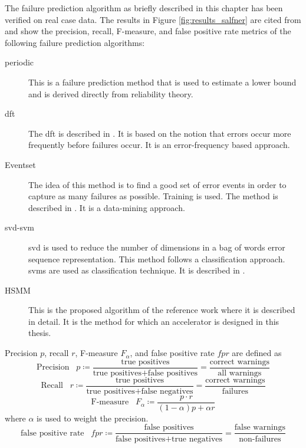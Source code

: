 \documentclass[mscthesis]{usiinfthesis}
\begin{document}
The failure prediction algorithm as briefly described in this chapter has been
verified on real case data. The results in Figure \ref{fig:results_salfner} are
cited from \cite{salfner08} and show the precision, recall, F-measure, and false
positive rate metrics of the following failure prediction algorithms:
\begin{description}
    \item[periodic] This is a failure prediction method that is used to estimate
        a lower bound and is derived directly from reliability theory.
    \item[\acrshort{dft}] The \acrfull{dft} is described in \cite{lin88}. It is
        based on the notion that errors occur more frequently before failures
        occur. It is an error-frequency based approach.
    \item[Eventset] The idea of this method is to find a good set of error
        events in order to capture as many failures as possible. Training is
        used. The method is described in \cite{ICDM02_Vilalta}. It is
        a data-mining approach.
    \item[\acrshort{svd}-\acrshort{svm}] \acrfull{svd} is used to reduce the
        number of dimensions in a bag of words error sequence representation.
        This method follows a classification approach. \glspl{svm} are used
        as classification technique. It is described in \cite{domeniconi02}.
    \item[HSMM] This is the proposed algorithm of the reference work
        \cite{salfner08} where it is described in detail. It is the method for
        which an accelerator is designed in this thesis.
\end{description}
Precision $p$, recall $r$, F-measure $F_\alpha$, and false positive rate $fpr$
are defined as
\begin{equation}
    \text{Precision} \;\;\; p
        \coloneqq \frac{\text{true positives}}{\text{true positives}
        +\text{false positives}}
        = \frac{\text{correct warnings}}{\text{all warnings}}
\end{equation}
\begin{equation}
    \text{Recall} \;\;\; r 
        \coloneqq \frac{\text{true positives}}{\text{true positives}
        +\text{false negatives}}
        = \frac{\text{correct warnings}}{\text{failures}}
\end{equation}
\begin{equation}
    \text{F-measure} \;\;\; F_{\alpha}
        \coloneqq \frac{p \cdot r}{(1-\alpha)p + \alpha r}
\end{equation}
where $\alpha$ is used to weight the precision.
\begin{equation}
    \text{false positive rate} \;\;\; fpr
    \coloneqq \frac{\text{false positives}}
        {\text{false positives}+\text{true negatives}}
        = \frac{\text{false warnings}}{\text{non-failures}}
\end{equation}
\end{document}
